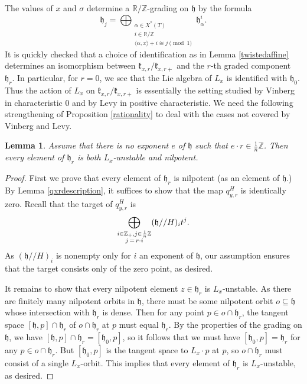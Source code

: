 \documentclass[12pt]{article}
\newtheorem{lemma}[theorem]{Lemma}
\theoremstyle{remark}
\begin{document}
The values of $x$ and $\sigma$ determine a $\mathbb{R}/\mathbb{Z}$-grading on $\mathfrak{h}$ by the formula
\[
\mathfrak{h}_j=\displaystyle\bigoplus_{\substack{\alpha\in X^*(T)\\i\in\mathbb{R}/\mathbb{Z}\\ \langle\alpha,x\rangle+i\cong j\pmod{1}}}\mathfrak{h}_{\alpha}^i.
\]
It is quickly checked that a choice of identification as in Lemma \ref{twistedaffine} determines an isomorphism between $\mathfrak{k}_{x,r}/\mathfrak{k}_{x,r+}$ and the $r$-th graded component $\mathfrak{h}_r.$ In particular, for $r=0$, we see that the Lie algebra of $L_x$ is identified with $\mathfrak{h}_0.$ Thus the action of $L_x$ on $\mathfrak{k}_{x,r}/
\mathfrak{k}_{x,r+}$ is essentially the setting studied by Vinberg \cite{Vinberg} in characteristic $0$ and by Levy \cite{Levy} in positive characteristic. We need the following strengthening of Proposition \ref{rationality} to deal with the cases not covered by Vinberg and Levy.

\begin{lemma}\label{baddenominator}
Assume that there is no exponent $e$ of $\mathfrak{h}$ such that $e\cdot r\in\frac{1}{n}\mathbb{Z}$. Then every element of $\mathfrak{h}_r$ is both $L_x$-unstable and nilpotent.
\end{lemma}

\begin{proof}
First we prove that every element of $\mathfrak{h}_r$ is nilpotent (as an element of $\mathfrak{h}.$) By Lemma \ref{qxrdescription}, it suffices to show that the map $q^H_{y,r}$ is identically zero. Recall that the target of $q^H_{y,r}$ is
\[
\displaystyle\bigoplus_{\substack{i\in\mathbb{Z}_+,j\in\frac{1}{n}\mathbb{Z}\\ j\thinspace=\thinspace r\cdot i}}(\mathfrak{h}//H)_it^j.
\]
As $(\mathfrak{h}//H)_i$ is nonempty only for $i$ an exponent of $\mathfrak{h}$, our assumption ensures that the target consists only of the zero point, as desired.

It remains to show that every nilpotent element $z\in\mathfrak{h}_r$ is $L_x$-unstable. As there are finitely many nilpotent orbits in $\mathfrak{h}$, there must be some nilpotent orbit $o\subseteq\mathfrak{h}$ whose intersection with $\mathfrak{h}_r$ is dense. Then for any point $p\in o\cap\mathfrak{h}_r$, the tangent space $[\mathfrak{h},p]\cap\mathfrak{h}_r$ of $o\cap\mathfrak{h}_r$ at $p$ must equal $\mathfrak{h}_r$. By the properties of the grading on $\mathfrak{h}$, we have $[\mathfrak{h},p]\cap\mathfrak{h}_r=[\mathfrak{h}_0,p]$, so it follows that we must have $[\mathfrak{h}_0,p]=\mathfrak{h}_r$ for any $p\in o\cap\mathfrak{h}_r.$ But $[\mathfrak{h}_0,p]$ is the tangent space to $L_x\cdot p$ at $p$, so $o\cap\mathfrak{h}_r$ must consist of a single $L_x$-orbit. This implies that every element of $\mathfrak{h}_r$ is $L_x$-unstable, as desired. 
 
\end{proof}
\end{document}
